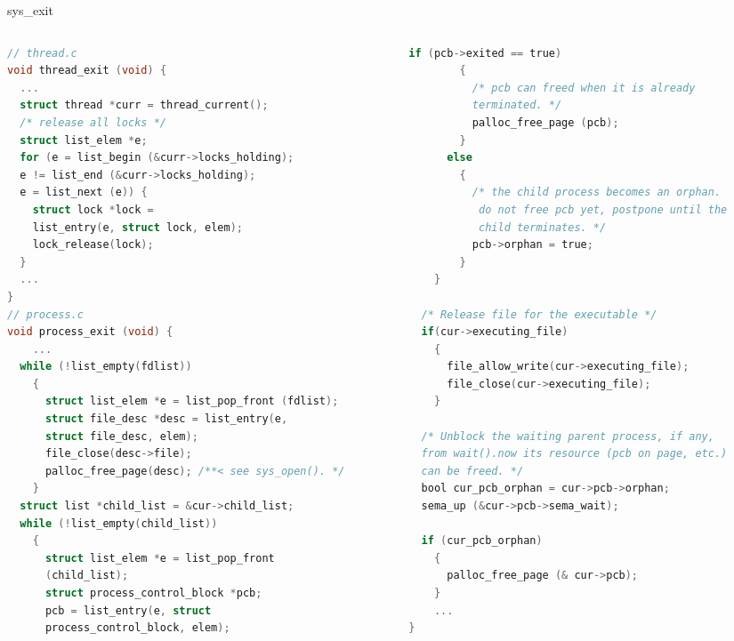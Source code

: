 \documentclass[10pt]{beamer}
\begin{document}
\begin{frame}[fragile]{sys\_exit}
\begin{columns}
\begin{column}{0.5\textwidth}
\begin{lstlisting}[language=C]
// thread.c
void thread_exit (void) {
  ...
  struct thread *curr = thread_current();
  /* release all locks */
  struct list_elem *e;
  for (e = list_begin (&curr->locks_holding);
  e != list_end (&curr->locks_holding);
  e = list_next (e)) {
    struct lock *lock = 
    list_entry(e, struct lock, elem);
    lock_release(lock);
  }
  ...
}
// process.c
void process_exit (void) {
    ...
  while (!list_empty(fdlist)) 
    {
      struct list_elem *e = list_pop_front (fdlist);
      struct file_desc *desc = list_entry(e,
      struct file_desc, elem);
      file_close(desc->file);
      palloc_free_page(desc); /**< see sys_open(). */
    }
  struct list *child_list = &cur->child_list;
  while (!list_empty(child_list)) 
    {
      struct list_elem *e = list_pop_front
      (child_list);
      struct process_control_block *pcb;
      pcb = list_entry(e, struct 
      process_control_block, elem);
\end{lstlisting}
\end{column}
\begin{column}{0.5\textwidth}
\begin{lstlisting}[language=C]
     if (pcb->exited == true) 
        {
          /* pcb can freed when it is already 
          terminated. */
          palloc_free_page (pcb);
        } 
      else 
        {
          /* the child process becomes an orphan.
           do not free pcb yet, postpone until the
           child terminates. */
          pcb->orphan = true;
        }
    }

  /* Release file for the executable */
  if(cur->executing_file) 
    {
      file_allow_write(cur->executing_file);
      file_close(cur->executing_file);
    }

  /* Unblock the waiting parent process, if any,
  from wait().now its resource (pcb on page, etc.)
  can be freed. */
  bool cur_pcb_orphan = cur->pcb->orphan;
  sema_up (&cur->pcb->sema_wait);

  if (cur_pcb_orphan) 
    {
      palloc_free_page (& cur->pcb);
    }
    ...
}
\end{lstlisting}
\end{column}
\end{columns}
\end{frame}
\end{document}
